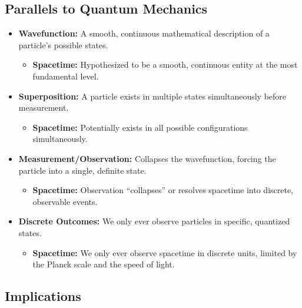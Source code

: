 \documentclass[12pt]{article}
\begin{document}
\subsection{Parallels to Quantum Mechanics}

\begin{itemize}
    \item \textbf{Wavefunction:} A smooth, continuous mathematical description of a particle's possible states.
    \begin{itemize}
        \item \textbf{Spacetime:} Hypothesized to be a smooth, continuous entity at the most fundamental level.
    \end{itemize}
    \item \textbf{Superposition:} A particle exists in multiple states simultaneously before measurement.
    \begin{itemize}
        \item \textbf{Spacetime:} Potentially exists in all possible configurations simultaneously.
    \end{itemize}
    \item \textbf{Measurement/Observation:} Collapses the wavefunction, forcing the particle into a single, definite state.
    \begin{itemize}
        \item \textbf{Spacetime:} Observation ``collapses'' or resolves spacetime into discrete, observable events.
    \end{itemize}
    \item \textbf{Discrete Outcomes:} We only ever observe particles in specific, quantized states.
    \begin{itemize}
        \item \textbf{Spacetime:} We only ever observe spacetime in discrete units, limited by the Planck scale and the speed of light.
    \end{itemize}
\end{itemize}

\subsection{Implications}
\end{document}
